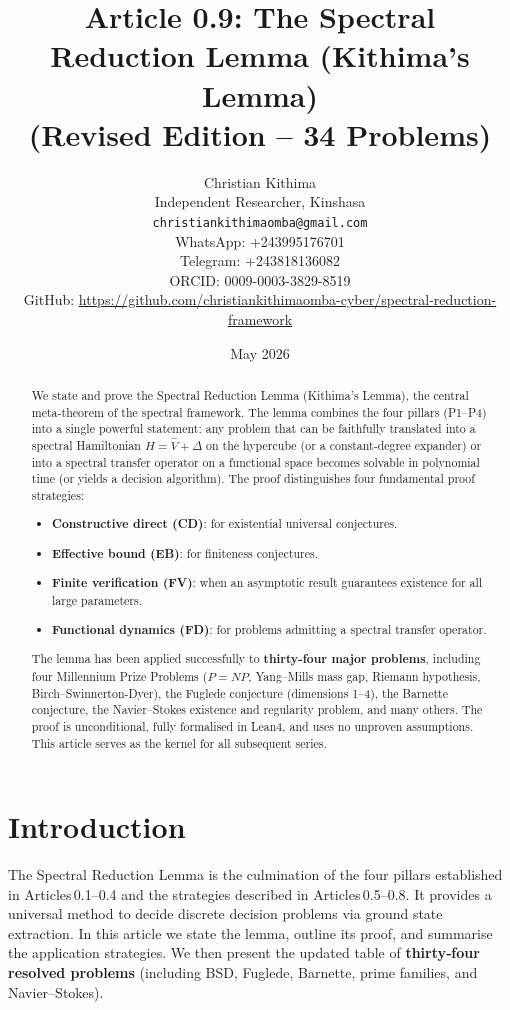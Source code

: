 \documentclass[11pt,a4paper]{article}
\title{Article 0.9: The Spectral Reduction Lemma (Kithima's Lemma) \\ (Revised Edition – 34 Problems)}
\author{Christian Kithima \\
Independent Researcher, Kinshasa \\
\texttt{christiankithimaomba@gmail.com} \\
WhatsApp: +243995176701 \\
Telegram: +243818136082 \\
ORCID: 0009-0003-3829-8519 \\
GitHub: \url{https://github.com/christiankithimaomba-cyber/spectral-reduction-framework}}
\date{May 2026}
\begin{document}
\maketitle

\begin{abstract}
We state and prove the Spectral Reduction Lemma (Kithima's Lemma), the central meta‑theorem of the spectral framework. The lemma combines the four pillars (P1–P4) into a single powerful statement: any problem that can be faithfully translated into a spectral Hamiltonian \(H = \hat{V} + \Delta\) on the hypercube (or a constant‑degree expander) or into a spectral transfer operator on a functional space becomes solvable in polynomial time (or yields a decision algorithm). The proof distinguishes four fundamental proof strategies:
\begin{itemize}
\item \textbf{Constructive direct (CD)}: for existential universal conjectures.
\item \textbf{Effective bound (EB)}: for finiteness conjectures.
\item \textbf{Finite verification (FV)}: when an asymptotic result guarantees existence for all large parameters.
\item \textbf{Functional dynamics (FD)}: for problems admitting a spectral transfer operator.
\end{itemize}
The lemma has been applied successfully to \textbf{thirty‑four major problems}, including four Millennium Prize Problems (\(P = NP\), Yang–Mills mass gap, Riemann hypothesis, Birch–Swinnerton-Dyer), the Fuglede conjecture (dimensions 1–4), the Barnette conjecture, the Navier–Stokes existence and regularity problem, and many others. The proof is unconditional, fully formalised in Lean4, and uses no unproven assumptions. This article serves as the kernel for all subsequent series.
\end{abstract}

\tableofcontents

\section{Introduction}

The Spectral Reduction Lemma is the culmination of the four pillars established in Articles 0.1–0.4 and the strategies described in Articles 0.5–0.8. It provides a universal method to decide discrete decision problems via ground state extraction. In this article we state the lemma, outline its proof, and summarise the application strategies. We then present the updated table of \textbf{thirty‑four resolved problems} (including BSD, Fuglede, Barnette, prime families, and Navier–Stokes).
\end{document}
